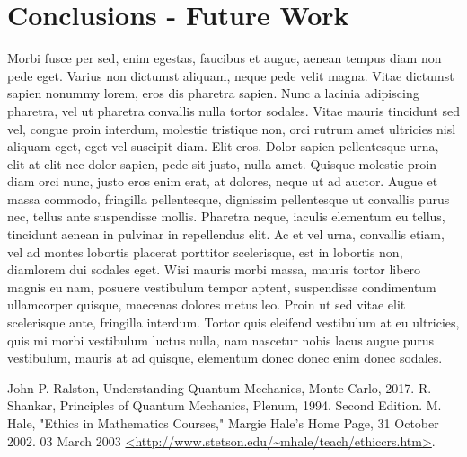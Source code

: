 \documentclass[12pt]{article}
\begin{document}
\section{Conclusions - Future Work}

Morbi fusce per sed, enim egestas, faucibus et augue, aenean tempus diam non pede eget. Varius non dictumst aliquam, neque pede velit magna. Vitae dictumst sapien nonummy lorem, eros dis pharetra sapien. Nunc a lacinia adipiscing pharetra, vel ut pharetra convallis nulla tortor sodales. Vitae mauris tincidunt sed vel, congue proin interdum, molestie tristique non, orci rutrum amet ultricies nisl aliquam eget, eget vel suscipit diam. Elit eros. Dolor sapien pellentesque urna, elit at elit nec dolor sapien, pede sit justo, nulla amet. Quisque molestie proin diam orci nunc, justo eros enim erat, at dolores, neque ut ad auctor.
Augue et massa commodo, fringilla pellentesque, dignissim pellentesque ut convallis purus nec, tellus ante suspendisse mollis. Pharetra neque, iaculis elementum eu tellus, tincidunt aenean in pulvinar in repellendus elit. Ac et vel urna, convallis etiam, vel ad montes lobortis placerat porttitor scelerisque, est in lobortis non, diamlorem dui sodales eget. Wisi mauris morbi massa, mauris tortor libero magnis eu nam, posuere vestibulum tempor aptent, suspendisse condimentum ullamcorper quisque, maecenas dolores metus leo. Proin ut sed vitae elit scelerisque ante, fringilla interdum. Tortor quis eleifend vestibulum at eu ultricies, quis mi morbi vestibulum luctus nulla, nam nascetur nobis lacus augue purus vestibulum, mauris at ad quisque, elementum donec donec enim donec sodales.

\begin{thebibliography}{9999}

 John P. Ralston, Understanding Quantum Mechanics, Monte Carlo, 2017.
 R. Shankar, Principles of Quantum Mechanics, Plenum, 1994. Second Edition. 
  M. Hale, "Ethics in Mathematics Courses," Margie Hale's Home Page, 31 October 2002. 03 March 2003 \url{ <http://www.stetson.edu/~mhale/teach/ethiccrs.htm>}. 
\end{thebibliography}
\end{document}
